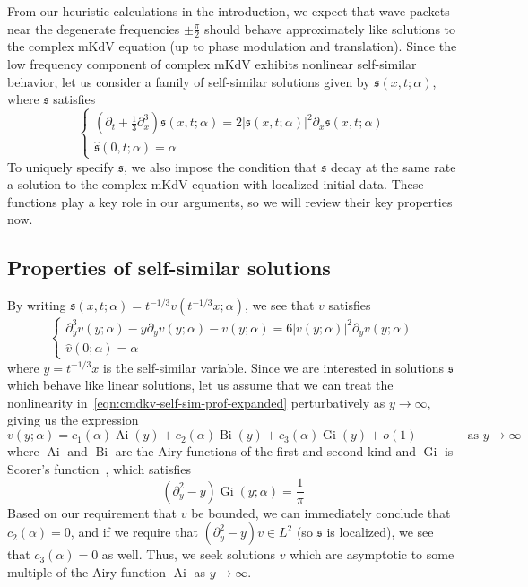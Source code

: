 \documentclass[letterpaper, reqno,final]{amsart}
\newcommand{\fs}{\mathfrak{s}}
\newcommand{\fhPi}{\frac{\pi}{2}}
\begin{document}
From our heuristic calculations in the introduction, we expect that wave-packets near the degenerate frequencies $\pm \fhPi$ should behave approximately like solutions to the complex mKdV equation (up to phase modulation and translation).  Since the low frequency component of complex mKdV exhibits nonlinear self-similar behavior, let us consider a family of self-similar solutions given by $\fs(x,t;\alpha)$, where $\fs$ satisfies
\begin{equation}\label{eqn:cmkdv-self-sim}
    \left\{\begin{array}{c}
        (\partial_t + \frac{1}{3}\partial_x^3) \fs(x,t;\alpha) = 2|\fs(x,t;\alpha)|^2 \partial_x \fs(x,t;\alpha)\\
        \hat{\fs}(0,t;\alpha) = \alpha
    \end{array}\right.
\end{equation}
To uniquely specify $\fs$, we also impose the condition that $\fs$ decay at the same rate a solution to the complex mKdV equation with localized initial data.  These functions play a key role in our arguments, so we will review their key properties now.

\subsection{Properties of self-similar solutions}

By writing $\fs(x,t;\alpha) = t^{-1/3} v(t^{-1/3} x;\alpha)$, we see that $v$ satisfies
\begin{equation}\label{eqn:cmdkv-self-sim-prof-expanded}
    \left\{\begin{array}{c}
        \partial_y^3 v(y;\alpha) -  y\partial_y v(y;\alpha) - v(y;\alpha) = 6|v(y;\alpha)|^2 \partial_y v(y;\alpha)\\
        \hat{v}(0;\alpha) = \alpha
    \end{array}\right.
\end{equation}
where $y = t^{-1/3}x$ is the self-similar variable.  Since we are interested in solutions $\fs$ which behave like linear solutions, let us assume that we can treat the nonlinearity in~\eqref{eqn:cmdkv-self-sim-prof-expanded} perturbatively as $y \to \infty$, giving us the expression
\begin{equation*}
    v(y;\alpha) = c_1(\alpha) \operatorname{Ai}(y) + c_2(\alpha) \operatorname{Bi}(y) + c_3(\alpha) \operatorname{Gi}(y) + o(1) \qquad\qquad \text{as } y \to \infty
\end{equation*}
where $\operatorname{Ai}$ and $\operatorname{Bi}$ are the Airy functions of the first and second kind and $\operatorname{Gi}$ is Scorer's function~\cite{scorerNumericalEvaluationIntegrals1950}, which satisfies
\begin{equation*}
    (\partial_y^2 - y) \operatorname{Gi}(y;\alpha) = \frac{1}{\pi}
\end{equation*}
Based on our requirement that $v$ be bounded, we can immediately conclude that $c_2(\alpha) = 0 $, and if we require that $(\partial^2_y - y)v \in L^2$ (so $\fs$ is localized), we see that $c_3(\alpha) = 0$ as well.  Thus, we seek solutions $v$ which are asymptotic to some multiple of the Airy function $\operatorname{Ai}$ as $y \to \infty$.
\end{document}

